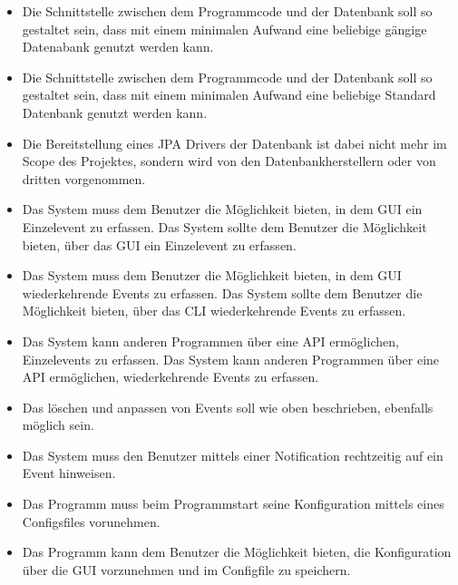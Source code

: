 \documentclass[11pt,titelpage]{scrreprt}
\begin{document}
\begin{itemize}

\item Die Schnittstelle zwischen dem Programmcode und der Datenbank soll so gestaltet sein, dass mit einem minimalen Aufwand eine beliebige gängige Datenabank genutzt werden kann.

\item
Die Schnittstelle zwischen dem Programmcode und der Datenbank soll so gestaltet sein, dass mit einem minimalen Aufwand eine beliebige Standard Datenbank genutzt werden kann.

\item
Die Bereitstellung eines JPA Drivers der Datenbank ist dabei nicht mehr im Scope des Projektes, sondern wird von den Datenbankherstellern oder von dritten vorgenommen.

\item
Das System muss dem Benutzer die Möglichkeit bieten, in dem GUI ein Einzelevent zu erfassen.
Das System sollte dem Benutzer die Möglichkeit bieten, über das GUI ein Einzelevent zu erfassen.

\item
Das System muss dem Benutzer die Möglichkeit bieten, in dem GUI wiederkehrende Events zu erfassen.
Das System sollte dem Benutzer die Möglichkeit bieten, über das CLI wiederkehrende Events zu erfassen.

\item
Das System kann anderen Programmen über eine API ermöglichen, Einzelevents zu erfassen.
Das System kann anderen Programmen über eine API ermöglichen, wiederkehrende Events zu erfassen.

\item
Das löschen und anpassen von Events soll wie oben beschrieben, ebenfalls möglich sein.

\item
Das System muss den Benutzer mittels einer Notification rechtzeitig auf ein Event hinweisen.

\item
Das Programm muss beim Programmstart seine Konfiguration mittels eines Configsfiles vorunehmen.

\item
Das Programm kann dem Benutzer die Möglichkeit bieten, die Konfiguration über die GUI vorzunehmen und im Configfile zu speichern.


\end{itemize}
\end{document}
